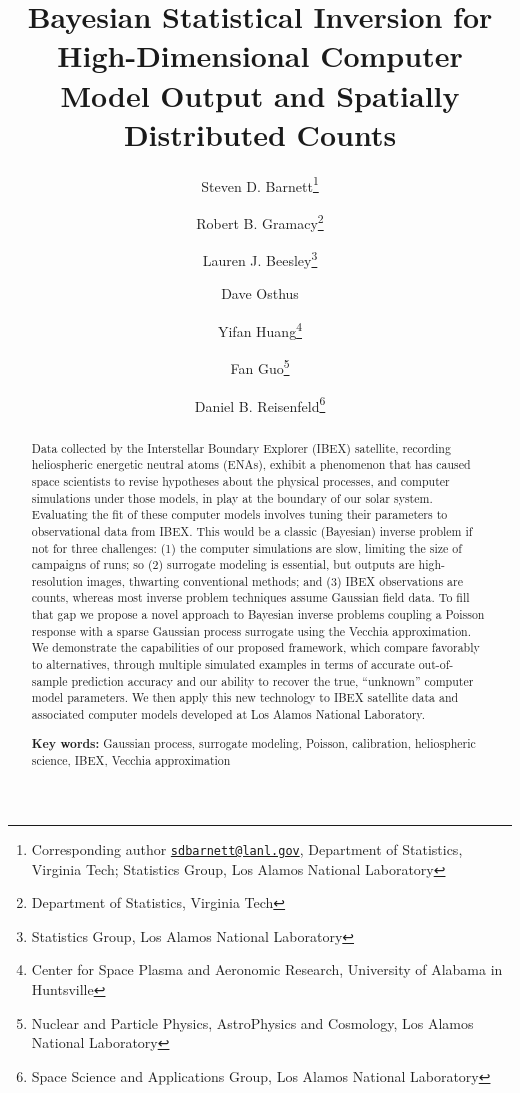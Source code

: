 \documentclass[11pt]{article}
\begin{document}
\title{Bayesian Statistical Inversion for High-Dimensional Computer Model
Output and Spatially Distributed Counts}
\author{Steven D. Barnett\thanks{Corresponding author
\href{mailto:sdbarnett@lanl.gov}{\tt sdbarnett@lanl.gov}, Department of
Statistics, Virginia Tech; Statistics Group, Los Alamos National Laboratory}
\and Robert B. Gramacy\thanks{Department of Statistics, Virginia Tech} \and
Lauren J. Beesley\thanks{Statistics Group, Los Alamos National Laboratory}
\and Dave Osthus\footnotemark[3] \and Yifan Huang\thanks{ Center for Space
Plasma and Aeronomic Research, University of Alabama in Huntsville }
\and Fan Guo\thanks{Nuclear and Particle Physics, AstroPhysics and Cosmology,
Los Alamos National Laboratory} \and Daniel B. Reisenfeld\thanks{Space Science
and Applications Group, Los Alamos National Laboratory}}
\date{}

\maketitle

\begin{abstract}
Data collected by the Interstellar Boundary Explorer (IBEX) satellite,
recording heliospheric energetic neutral atoms (ENAs), exhibit a phenomenon
that has caused space scientists to revise hypotheses about the physical
processes, and computer simulations under those models, in play at the
boundary of our solar system.  Evaluating the fit of these computer models
involves tuning their parameters to observational data from IBEX. This would
be a classic (Bayesian) inverse problem if not for three challenges: (1) the
computer simulations are slow, limiting the size of campaigns of runs; so (2)
surrogate modeling is essential, but outputs are high-resolution images,
thwarting conventional methods; and (3) IBEX observations are counts, whereas
most inverse problem techniques assume Gaussian field data. To fill that gap
we propose a novel approach to Bayesian inverse problems coupling a Poisson
response with a sparse Gaussian process surrogate using the Vecchia
approximation.  We demonstrate the capabilities of our proposed framework,
which compare favorably to alternatives, through multiple simulated examples
{\color{red} in terms of accurate out-of-sample prediction accuracy and our
ability to recover the true, ``unknown'' computer model parameters.} We then
apply this new technology to IBEX satellite data and associated computer
models developed at Los Alamos National Laboratory.

\bigskip
\noindent \textbf{Key words:} Gaussian process, surrogate modeling,
Poisson, calibration, heliospheric science, IBEX, Vecchia approximation
\end{abstract}
\end{document}
